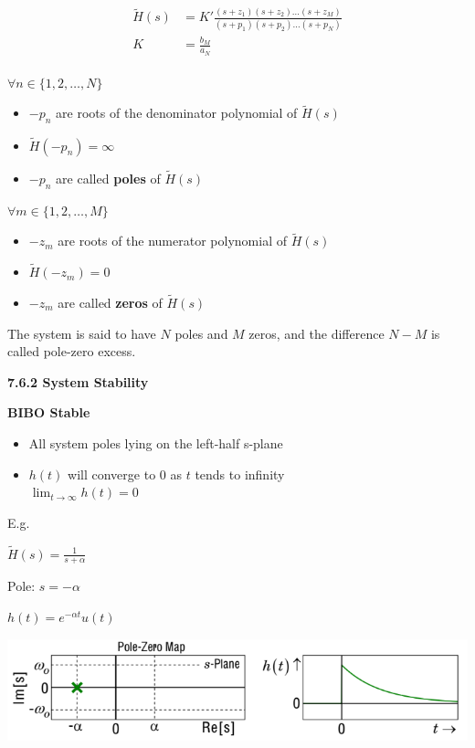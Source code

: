 \documentclass[landscape,a4paper]{extarticle}
\newenvironment{Figure}
  {\par\medskip\noindent\minipage{\linewidth}}
  {\endminipage\par\medskip}
\begin{document}
\begin{multicols*}{5}
    \begin{align*}
        \begin{split}
            \tilde{H}(s) &= K'\frac{(s+z_1)(s+z_2)\ldots (s+z_M)}{(s+p_1)(s+p_2)\ldots (s+p_N)} \\
            K &=  \frac{b_M}{a_N}
        \end{split} \tag{7.23c}
    \end{align*}

    $\forall n \in \{1,2, \ldots , N\}$ 
    \begin{itemize}
        \item $-p_n$ are roots of the denominator polynomial of $\tilde{H}(s)$
        \item $\tilde{H}(-p_n) = \infty$
        \item $-p_n$ are called \textbf{poles} of $\tilde{H}(s)$
    \end{itemize}
    $\forall m \in \{1,2, \ldots , M\}$ 
    \begin{itemize}
        \item $-z_m$ are roots of the numerator polynomial of $\tilde{H}(s)$
        \item $\tilde{H}(-z_m) = 0$
        \item $-z_m$ are called \textbf{zeros} of $\tilde{H}(s)$
    \end{itemize}

    The system is said to have $N$ poles and $M$ zeros, and the difference $N-M$ is called pole-zero excess.

    \textbf{7.6.2 System Stability}

    \textbf{BIBO Stable}
    \begin{itemize}
        \item All system poles lying on the left-half s-plane
        \item $h(t)$ will converge to 0 as $t$ tends to infinity\\
        $\lim_{t \to \infty} h(t) = 0$
    \end{itemize}

    E.g.

    $\tilde{H}(s) = \frac{1}{s + \alpha}$

    Pole: $s = - \alpha$

    $h(t) = e^{-\alpha t} u(t)$
    \begin{Figure}
        \centering
        \includegraphics[width=\linewidth]{biboStable1.png}        
    \end{Figure}


\end{multicols*}
\end{document}
